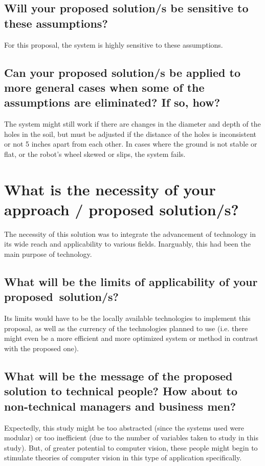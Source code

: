 		\subsection{Will your proposed solution/s be sensitive to these assumptions?}
For this proposal, the system is highly sensitive to these assumptions.
  	\subsection{Can your proposed solution/s be applied to more general cases when some of the assumptions are eliminated? If so, how?}
The system might still work if there are changes in the diameter and depth of the holes in the soil, but must be adjusted if the distance of the holes is inconsistent or not 5 inches apart from each other. In cases where the ground is not stable or flat, or the robot’s wheel skewed or slips, the system fails. 

\section{What is the necessity of your approach / proposed solution/s?}

The necessity of this solution was to integrate the advancement of technology in its wide reach and applicability to various fields. Inarguably, this had been the main purpose of technology. 
	
		\subsection{What will be the limits of applicability of your proposed~solution/s?}
		
		Its limits would have to be the locally available technologies to implement this proposal, as well as the currency of the technologies planned to use (i.e. there might even be a more efficient and more optimized system or method in contrast with the proposed one).
		
		\subsection{What will be the message of the proposed solution to technical people?  How about to non-technical managers and business men?}

Expectedly, this study might be too abstracted (since the systems used were modular) or too inefficient (due to the number of variables taken to study in this study). But, of greater potential to computer vision, these people might begin to stimulate theories of computer vision in this type of application specifically.

